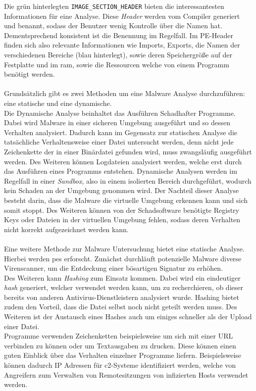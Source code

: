 \documentclass[
    12pt, %
    DIV10,
    ngerman, %
    a4paper, %
    oneside, %
    titlepage, %
    parskip=half, %
    headings=normal, %
    listof=totoc, %
    bibliography=totoc, %
    index=totoc, %
    captions=tableheading, %
    final %
]{scrreprt}
\begin{document}
Die grün hinterlegten \texttt{IMAGE\_SECTION\_HEADER} bieten die interessantesten Informationen für eine Analyse. Diese \emph{Header} werden vom Compiler generiert und benannt, sodass der Benutzer wenig Kontrolle über die Namen hat. Dementsprechend konsistent ist die Benennung im Regelfall. Im PE-Header finden sich also relevante Informationen wie Imports, Exports, die Namen der verschiedenen Bereiche (blau hinterlegt), sowie deren Speichergröße auf der Festplatte und im \ac{ram}, sowie die Ressourcen welche von einem Programm benötigt werden.
\\\\
Grundsätzlich gibt es zwei Methoden um eine Malware Analyse durchzuführen: eine statische und eine dynamische.\\
Die Dynamische Analyse beinhaltet das Ausführen Schadhafter Programme. Dabei wird Malware in einer sicheren Umgebung ausgeführt und so dessen Verhalten analysiert. Dadurch kann im Gegensatz zur statischen Analyse die tatsächliche Verhaltensweise einer Datei untersucht werden, denn nicht jede Zeichenkette der in einer Binärdatei gefunden wird, muss zwangsläufig ausgeführt werden. Des Weiteren können Logdateien analysiert werden, welche erst durch das Ausführen eines Programms entstehen.
Dynamische Analysen werden im Regelfall in einer \emph{Sandbox}, also in einem isolierten Bereich durchgeführt, wodurch kein Schaden an der Umgebung genommen wird.
Der Nachteil dieser Analyse besteht darin, dass die Malware die virtuelle Umgebung erkennen kann und sich somit stoppt. Des Weiteren können von der Schadsoftware benötigte Registry Keys oder Dateien in der virtuellen Umgebung fehlen, sodass deren Verhalten nicht korrekt aufgezeichnet werden kann.\\\\
Eine weitere Methode zur Malware Untersuchung bietet eine statische Analyse. Hierbei werden \ac{pes} erforscht. Zunächst durchläuft potenzielle Malware diverse Virenscanner, um die Entdeckung einer bösartigen Signatur zu erhöhen.\\ 
Des Weiteren kann \emph{Hashing} zum Einsatz kommen. Dabei wird ein eindeutiger \emph{hash} generiert, welcher verwendet werden kann, um zu recherchieren, ob dieser bereits von anderen Antivirus-Dienstleistern analysiert wurde. Hashing bietet zudem den Vorteil, dass die Datei selbst noch nicht geteilt werden muss. Des Weiteren ist der Austausch eines Hashes auch um einiges schneller als der Upload einer Datei.\\
Programme verwenden Zeichenketten beispielsweise um sich mit einer URL verbinden zu können oder um Textausgaben zu drucken. Diese können einen guten Einblick über das Verhalten einzelner Programme liefern. Beispielsweise können dadurch IP Adressen für \ac{c2}-Systeme identifiziert werden, welche von Angreifern zum Verwalten von Remotesitzungen von infizierten Hosts verwendet werden.\\
\end{document}
